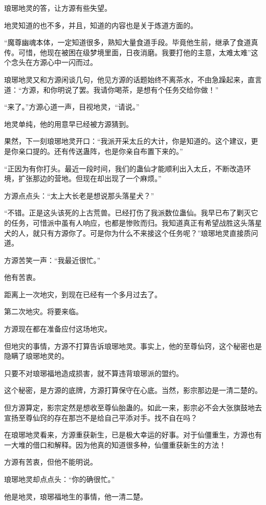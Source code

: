 \begin{this_body}
琅琊地灵的答，让方源有些失望。

地灵知道的也不多，并且，知道的内容也是关于炼道方面的。

“魔尊幽魂本体，一定知道很多，熟知大量食道手段。毕竟他生前，继承了食道真传。可惜，他现在被困在级梦境里面，日夜消磨。我要打他的主意，太难太难”这个念头在方源心中一闪而过。

琅琊地灵又和方源闲谈几句，他见方源的话题始终不离茶水，不由急躁起来，直言道：“方源，和你明说了罢。我请你喝茶，是想有个任务交给你做！”

“来了。”方源心道一声，目视地灵，“请说。”

地灵单纯，他的用意早已经被方源猜到。

果然，下一刻琅琊地灵开口：“我派开采太丘的大计，你是知道的。这个建议，更是你亲口提的。还有传送蛊阵，也是你亲自布置下来的。”

“正因为有你打头。最近一段时间，我们的蛊仙才能顺利出入太丘，不断改造环境，扩张那边的营地。但现在却出现了一个麻烦。”

方源点点头：“太上大长老是想说那头落星犬？”

“不错。正是这头该死的上古荒兽。已经打伤了我派数位蛊仙。我早已布了剿灭它的任务，可惜派中虽有人响应，也都是惨败而归。我知道真正有希望战胜这头落星犬的人，就只有方源你了。可是你为什么不来接这个任务呢？”琅琊地灵直接质问道。

方源苦笑一声：“我最近很忙。”

他有苦衷。

距离上一次地灾，到现在已经有一个多月过去了。

第二次地灾。将要来临。

方源现在都在准备应付这场地灾。

但地灾的事情，方源不打算告诉琅琊地灵。事实上，他的至尊仙窍，这个秘密也是隐瞒了琅琊地灵的。

只要不对琅琊福地造成损害，就不算违背琅琊派的盟约。

这个秘密，是方源的底牌，方源打算保守在心底。当然，影宗那边是一清二楚的。

但方源算定，影宗定然是想收至尊仙胎蛊的。如此一来，影宗必不会大张旗鼓地去宣扬至尊仙窍的存在那岂不是给自己平添对手。找不自在吗？

在琅琊地灵看来，方源重获新生，已是极大幸运的好事。对于仙僵重生，方源也有一大堆的借口和解释。因为他真的知道很多种，仙僵重获新生的方法！

方源有苦衷，但他不能明说。

琅琊地灵却点点头：“你的确很忙。”

他是地灵，琅琊福地生的事情，他一清二楚。


\end{this_body}
